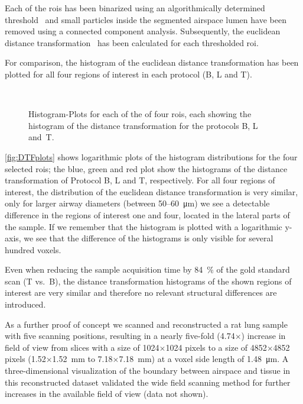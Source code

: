 Each of the \acp{roi} has been binarized using an algorithmically determined threshold~\cite{Otsu1979} and small particles inside the segmented airspace lumen have been removed using a connected component analysis. Subsequently, the euclidean distance transformation~\cite{Danielsson1980} has been calculated for each thresholded \ac{roi}.

For comparison, the histogram of the euclidean distance transformation has been plotted for all four regions of interest in each protocol (B, L and T).

\renewcommand{\imsize}{0.705\linewidth}%
\begin{figure}[htb]%
	\noindent\makebox[\textwidth]{%
		\subfloat{}%
		\subfloat{}%
	}%
	\\%
	\noindent\makebox[\textwidth]{%
		\subfloat{}%
		\subfloat{}%
	}%
	\caption[Histogram-Plots]{Histogram-Plots for each of the of four \acp{roi}, each showing the histogram of the distance transformation for the protocols B, L and~T.}%
	\label{fig:DTFplots}
\end{figure}%

\autoref{fig:DTFplots} shows logarithmic plots of the histogram distributions for the four selected \acp{roi}; the blue, green and red plot show the histograms of the distance transformation of Protocol B, L and T, respectively. For all four regions of interest, the distribution of the euclidean distance transformation is very similar, only for larger airway diameters (between 50--\SI{60}{\micro\meter}) we see a detectable difference in the regions of interest one and four, located in the lateral parts of the sample. If we remember that the histogram is plotted with a logarithmic y-axis, we see that the difference of the histograms is only visible for several hundred voxels.

Even when reducing the sample acquisition time by \SI{84}{\percent} of the gold standard scan (T vs.\ B), the distance transformation histograms of the shown regions of interest are very similar and therefore no relevant structural differences are introduced.

As a further proof of concept we scanned and reconstructed a rat lung sample with five scanning positions, resulting in a nearly five-fold (4.74$\times$) increase in field of view from slices with a size of 1024$\times$1024 pixels to a size of 4852$\times$4852 pixels (1.52$\times$\SI{1.52}{\milli\meter} to 7.18$\times$\SI{7.18}{\milli\meter}) at a voxel side length of \SI{1.48}{\micro\meter}. A three-dimensional visualization of the boundary between airspace and tissue in this reconstructed dataset validated the wide field scanning method for further increases in the available field of view (data not shown).

